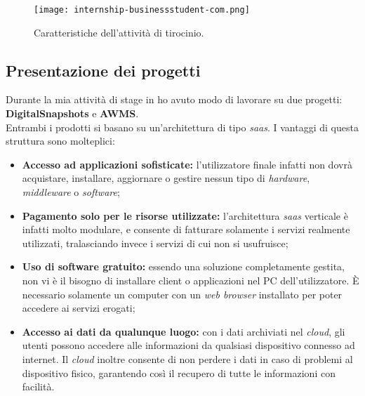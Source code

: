 \begin{figure}[h]
\texttt{[image: internship-businessstudent-com.png]}
\centering
\caption{Caratteristiche dell'attività di tirocinio.} 
\label{fig:internship}
\end{figure}

\subsection{Presentazione dei progetti}
Durante la mia attività di stage in \AD{} ho avuto modo di lavorare su due progetti: \textbf{DigitalSnapshots} e \textbf{AWMS}.\\
Entrambi i prodotti si basano su un'architettura di tipo \textit{\acrshort{saas}}.
I vantaggi di questa struttura sono molteplici: 
\begin{itemize}
\item \textbf{Accesso ad applicazioni sofisticate:} l'utilizzatore finale infatti non dovrà acquistare, installare, aggiornare o gestire nessun tipo di \textit{hardware}, \textit{middleware} o \textit{software};
\item \textbf{Pagamento solo per le risorse utilizzate:} l'architettura \textit{\acrshort{saas}} verticale è infatti molto modulare, e consente di fatturare solamente i servizi realmente utilizzati, tralasciando invece i servizi di cui non si usufruisce;
\item \textbf{Uso di software  gratuito:} essendo una soluzione completamente gestita, non vi è il bisogno di installare \gls{client} o applicazioni nel PC dell'utilizzatore. \`E necessario solamente un computer con un \textit{web browser} installato per poter accedere ai servizi erogati;
\item \textbf{Accesso ai dati da qualunque luogo:} con i dati archiviati nel \textit{\gls{cloud}}, gli utenti possono accedere alle informazioni da qualsiasi dispositivo connesso ad internet. Il \textit{\gls{cloud}} inoltre consente di non perdere i dati in caso di problemi al dispositivo fisico, garantendo così il recupero di tutte le informazioni con facilità.
\end{itemize}

